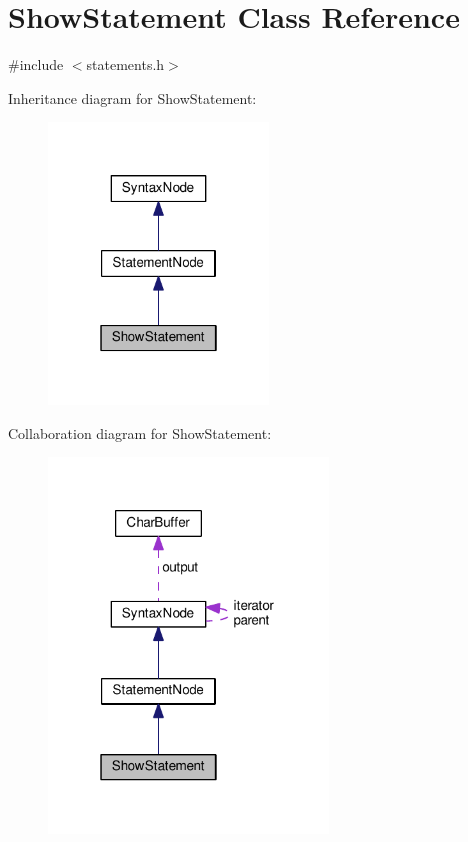 \hypertarget{classShowStatement}{}\section{Show\+Statement Class Reference}
\label{classShowStatement}


{\ttfamily \#include $<$statements.\+h$>$}



Inheritance diagram for Show\+Statement\+:\nopagebreak
\begin{figure}[H]
\begin{center}
\leavevmode
\includegraphics[width=166pt]{classShowStatement__inherit__graph}
\end{center}
\end{figure}


Collaboration diagram for Show\+Statement\+:\nopagebreak
\begin{figure}[H]
\begin{center}
\leavevmode
\includegraphics[width=211pt]{classShowStatement__coll__graph}
\end{center}
\end{figure}
